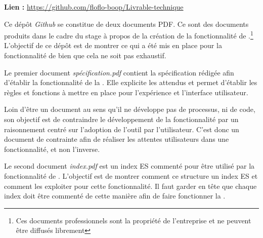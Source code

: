 
\textbf{Lien :} \url{https://github.com/floflo-boop/Livrable-technique}\newline

Ce dépôt \textit{Github} se constitue de deux documents PDF. Ce sont des documents produits dans le cadre du stage à propos de la création de la fonctionnalité de .\footnote{Ces documents professionnels sont la propriété de l'entreprise et ne peuvent être diffusés librement} L'objectif de ce dépôt est de montrer ce qui a été mis en place pour la fonctionnalité de  bien que cela ne soit pas exhaustif.\newline

Le premier document \textit{spécification.pdf} contient la spécification rédigée afin d'établir la fonctionnalité de la . Elle explicite les attendus et permet d'établir les règles et fonctions à mettre en place pour l'expérience et l'interface utilisateur.

Loin d'être un document  au sens qu'il ne développe pas de processus, ni de code, son objectif est de contraindre le développement de la fonctionnalité par un raisonnement centré sur l'adoption de l'outil par l'utilisateur. C'est donc un document de contrainte afin de réaliser les attentes utilisateurs dans une fonctionnalité, et non l'inverse.\newline

Le second document \textit{index.pdf} est un index \gls{ES} commenté pour être utilisé par la fonctionnalité de . L'objectif est de montrer comment ce structure un index \gls{ES} et comment les exploiter pour cette fonctionnalité. Il faut garder en tête que chaque index doit être commenté de cette manière afin de faire fonctionner la .